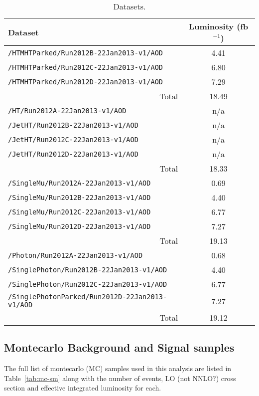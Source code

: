 \begin{table}[h]
  \caption{Datasets.}
  \label{tab:datasets}
  \centering
  \scriptsize
  \begin{tabular}{ lc }
    \hline
    \hline
    Dataset & Luminosity (fb$^{-1}$) \\
    \hline
    \verb!/HTMHTParked/Run2012B-22Jan2013-v1/AOD! & 4.41 \\
    \verb!/HTMHTParked/Run2012C-22Jan2013-v1/AOD! & 6.80 \\
    \verb!/HTMHTParked/Run2012D-22Jan2013-v1/AOD! & 7.29 \\
    \multicolumn{1}{r}{Total} & 18.49 \\ [0.5ex]
    \verb!/HT/Run2012A-22Jan2013-v1/AOD! & n/a \\
    \verb!/JetHT/Run2012B-22Jan2013-v1/AOD! & n/a \\
    \verb!/JetHT/Run2012C-22Jan2013-v1/AOD! & n/a \\
    \verb!/JetHT/Run2012D-22Jan2013-v1/AOD! & n/a \\
    \multicolumn{1}{r}{Total} & 18.33 \\ [0.5ex]
    \verb!/SingleMu/Run2012A-22Jan2013-v1/AOD! & 0.69 \\
    \verb!/SingleMu/Run2012B-22Jan2013-v1/AOD! & 4.40 \\
    \verb!/SingleMu/Run2012C-22Jan2013-v1/AOD! & 6.77 \\
    \verb!/SingleMu/Run2012D-22Jan2013-v1/AOD! & 7.27 \\
    \multicolumn{1}{r}{Total} & 19.13 \\ [0.5ex] %
    \verb!/Photon/Run2012A-22Jan2013-v1/AOD! & 0.68 \\
    \verb!/SinglePhoton/Run2012B-22Jan2013-v1/AOD! & 4.40 \\
    \verb!/SinglePhoton/Run2012C-22Jan2013-v1/AOD! & 6.77 \\
    \verb!/SinglePhotonParked/Run2012D-22Jan2013-v1/AOD! & 7.27 \\
    \multicolumn{1}{r}{Total} & 19.12 \\ [0.5ex] %
    \hline
    \hline
  \end{tabular}
\end{table}

\subsection{Montecarlo Background and Signal samples}

The full list of montecarlo (MC) samples used in this analysis are listed in 
Table~\ref{tab:mc-sm} along with the number of events, LO (not NNLO?) cross 
section and effective integrated luminosity for each.

